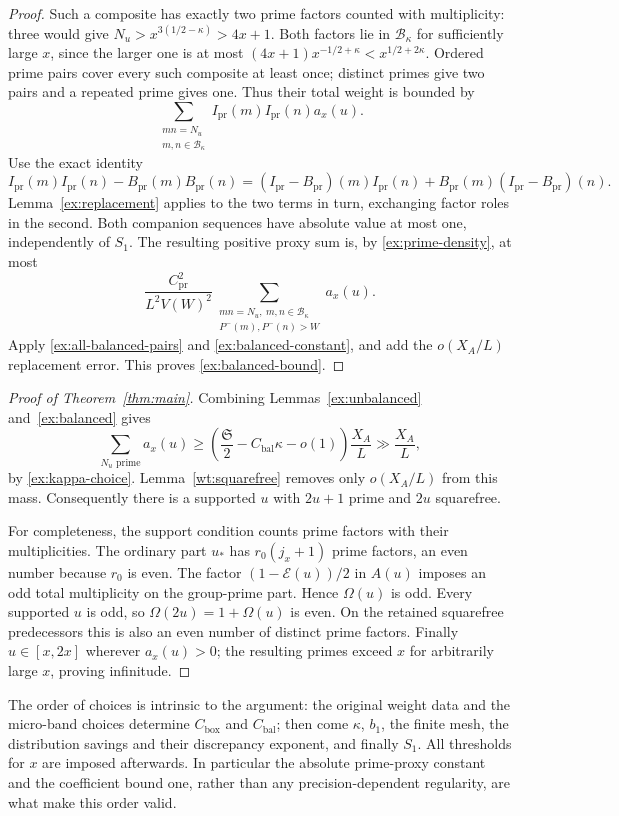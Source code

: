\begin{proof}
Such a composite has exactly two prime factors counted with
multiplicity: three would give
$N_u>x^{3(1/2-\kappa)}>4x+1$. Both factors lie in
$\mathcal B_\kappa$ for sufficiently large $x$, since the larger
one is at most $(4x+1)x^{-1/2+\kappa}<x^{1/2+2\kappa}$.
Ordered prime pairs cover every such composite at least once;
distinct primes give two pairs and a repeated prime gives one.
Thus their total weight is bounded by
\[
 \sum_{\substack{mn=N_u\\m,n\in\mathcal B_\kappa}}
              I_{\mathrm{pr}}(m)I_{\mathrm{pr}}(n)a_x(u).
\]
Use the exact identity
\[
 I_{\mathrm{pr}}(m)I_{\mathrm{pr}}(n)
       -B_{\mathrm{pr}}(m)B_{\mathrm{pr}}(n)
 =(I_{\mathrm{pr}}-B_{\mathrm{pr}})(m)I_{\mathrm{pr}}(n)
   +B_{\mathrm{pr}}(m)(I_{\mathrm{pr}}-B_{\mathrm{pr}})(n).
\]
Lemma~\ref{ex:replacement} applies to the two terms in turn,
exchanging factor roles in the second. Both companion sequences
have absolute value at most one, independently of $S_1$.
The resulting positive proxy sum is, by
\eqref{ex:prime-density}, at most
\begin{equation}\label{ex:prime-to-positive}
 \frac{C_{\mathrm{pr}}^2}{L^2V(W)^2}
 \sum_{\substack{mn=N_u,\ m,n\in\mathcal B_\kappa\\
                  P^-(m),P^-(n)>W}}a_x(u).
\end{equation}
Apply \eqref{ex:all-balanced-pairs} and
\eqref{ex:balanced-constant}, and add the $o(X_A/L)$ replacement
error. This proves \eqref{ex:balanced-bound}.
\end{proof}

\begin{proof}[Proof of Theorem~\ref{thm:main}]
Combining Lemmas~\ref{ex:unbalanced} and~\ref{ex:balanced} gives
\[
 \sum_{N_u\text{ prime}}a_x(u)
 \ge\left(\frac{\mathfrak S}{2}
               -C_{\mathrm{bal}}\kappa-o(1)\right)\frac{X_A}{L}
 \gg\frac{X_A}{L},
\]
by \eqref{ex:kappa-choice}. Lemma~\ref{wt:squarefree} removes only
$o(X_A/L)$ from this mass.
Consequently there is a supported $u$ with $2u+1$ prime and
$2u$ squarefree.

For completeness, the support condition counts prime factors with
their multiplicities. The ordinary part $u_*$ has
$r_0(j_x+1)$ prime factors, an even number because $r_0$ is even.
The factor $(1-\mathcal E(u))/2$ in $A(u)$ imposes an odd total
multiplicity on the group-prime part. Hence $\Omega(u)$ is odd.
Every supported $u$ is odd, so
$\Omega(2u)=1+\Omega(u)$ is even. On the retained squarefree
predecessors this is also an even number of distinct prime
factors. Finally $u\in[x,2x]$ wherever $a_x(u)>0$; the resulting
primes exceed $x$ for arbitrarily large $x$, proving infinitude.
\end{proof}

The order of choices is intrinsic to the argument: the original
weight data and the micro-band choices determine
$C_{\mathrm{box}}$ and $C_{\mathrm{bal}}$; then come $\kappa$,
$b_1$, the finite mesh, the distribution savings and their
discrepancy exponent, and finally $S_1$. All thresholds for $x$
are imposed afterwards. In particular the absolute prime-proxy
constant and the coefficient bound one, rather than any
precision-dependent regularity, are what make this order valid.
